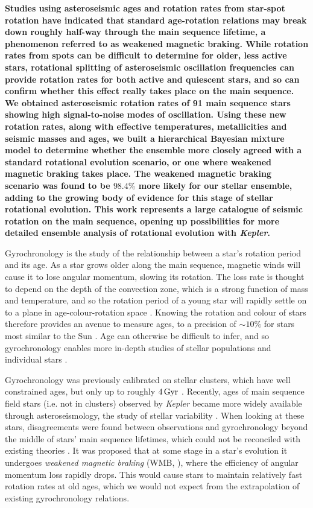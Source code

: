 \documentclass[12pt]{article}
\newcommand{\kepler}{\emph{Kepler}\xspace}
\begin{document}
\textbf{Studies using asteroseismic ages and rotation rates from star-spot rotation have indicated that standard age-rotation relations may break down roughly half-way through the main sequence lifetime, a phenomenon referred to as weakened magnetic braking. While rotation rates from spots can be difficult to determine for older, less active stars, rotational splitting of asteroseismic oscillation frequencies can provide rotation rates for both active and quiescent stars, and so can confirm whether this effect really takes place on the main sequence.\\
We obtained asteroseismic rotation rates of 91 main sequence stars showing high signal-to-noise modes of oscillation.
Using these new rotation rates, along with effective temperatures, metallicities and seismic masses and ages, we built a hierarchical Bayesian mixture model to determine whether the ensemble more closely agreed with a standard rotational evolution scenario, or one where weakened magnetic braking takes place. The weakened magnetic braking scenario was found to be $98.4\%$ more likely for our stellar ensemble, adding to the growing body of evidence for this stage of stellar rotational evolution. This work represents a large catalogue of seismic rotation on the main sequence, opening up possibilities for more detailed ensemble analysis of rotational evolution with \textit{Kepler}.}

Gyrochronology is the study of the relationship between a star's rotation period and its age. As a star grows older along the main sequence, magnetic winds will cause it to lose angular momentum, slowing its rotation. The loss rate is thought to depend on the depth of the convection zone, which is a strong function of mass and temperature, and so the rotation period of a young star will rapidly settle on to a plane in age-colour-rotation space \cite{barnes2007}. Knowing the rotation and colour of stars therefore provides an avenue to measure ages, to a precision of $\sim 10\%$ for stars most similar to the Sun \cite{meibom+2015}. Age can otherwise be difficult to infer, and so gyrochronology enables more in-depth studies of stellar populations and individual stars \cite{leiner+2019,claytor+2019}.

Gyrochronology was previously calibrated on stellar clusters, which have well constrained ages, but only up to roughly $4\, \rm{Gyr}$ \cite{meibom+2015, barnes+2016}. Recently, ages of main sequence field stars (i.e. not in clusters) observed by \kepler \cite{borucki+2010} became more widely available through asteroseismology, the study of stellar variability \cite{silvaaguirre+2015}. When looking at these stars, disagreements were found between observations and gyrochronology beyond the middle of stars' main sequence lifetimes, which could not be reconciled with existing theories \cite{angus+2015, nielsen+2015, davies+2015}. It was proposed that at some stage in a star's evolution it undergoes \textit{weakened magnetic braking} (WMB, \cite{vansaders+2016}), where the efficiency of angular momentum loss rapidly drops. This would cause stars to maintain relatively fast rotation rates at old ages, which we would not expect from the extrapolation of existing gyrochronology relations.
\end{document}
